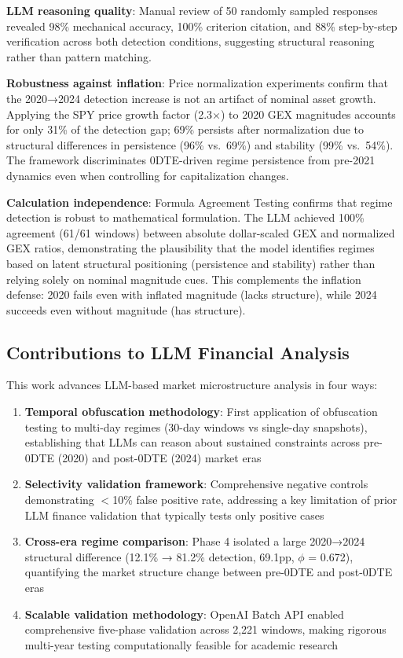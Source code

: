 \textbf{LLM reasoning quality}: Manual review of 50 randomly sampled responses revealed 98\% mechanical accuracy, 100\% criterion citation, and 88\% step-by-step verification across both detection conditions, suggesting structural reasoning rather than pattern matching.

\textbf{Robustness against inflation}: Price normalization experiments confirm that the 2020→2024 detection increase is not an artifact of nominal asset growth. Applying the SPY price growth factor (2.3$\times$) to 2020 GEX magnitudes accounts for only 31\% of the detection gap; 69\% persists after normalization due to structural differences in persistence (96\% vs.\ 69\%) and stability (99\% vs.\ 54\%). The framework discriminates 0DTE-driven regime persistence from pre-2021 dynamics even when controlling for capitalization changes.

\textbf{Calculation independence}: Formula Agreement Testing confirms that regime detection is robust to mathematical formulation. The LLM achieved 100\% agreement (61/61 windows) between absolute dollar-scaled GEX and normalized GEX ratios, demonstrating the plausibility that the model identifies regimes based on latent structural positioning (persistence and stability) rather than relying solely on nominal magnitude cues. This complements the inflation defense: 2020 fails even with inflated magnitude (lacks structure), while 2024 succeeds even without magnitude (has structure).

\subsection{Contributions to LLM Financial Analysis}

This work advances LLM-based market microstructure analysis in four ways:

\begin{enumerate}
\item \textbf{Temporal obfuscation methodology}: First application of obfuscation testing to multi-day regimes (30-day windows vs single-day snapshots), establishing that LLMs can reason about sustained constraints across pre-0DTE (2020) and post-0DTE (2024) market eras
\item \textbf{Selectivity validation framework}: Comprehensive negative controls demonstrating $<$10\% false positive rate, addressing a key limitation of prior LLM finance validation that typically tests only positive cases
\item \textbf{Cross-era regime comparison}: Phase 4 isolated a large 2020→2024 structural difference (12.1\% → 81.2\% detection, 69.1pp, $\phi$ = 0.672), quantifying the market structure change between pre-0DTE and post-0DTE eras
\item \textbf{Scalable validation methodology}: OpenAI Batch API enabled comprehensive five-phase validation across 2,221 windows, making rigorous multi-year testing computationally feasible for academic research
\end{enumerate}

